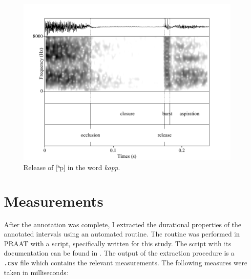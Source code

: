 \documentclass[11pt,a4paper,openany]{memoir}\usepackage[]{graphicx}\usepackage[]{color}
\begin{document}
\begin{figure}
\centering
\includegraphics[width=\textwidth]{kopp}
\caption{Release of [ʰp] in the word \textit{kopp}.}
\label{f:release}
\end{figure}

\section{Measurements}
\label{s:measurements}
After the annotation was complete, I extracted the durational properties of the annotated intervals using an automated routine.
The routine was performed in PRAAT with a script, specifically written for this study.
The script with its documentation can be found in .
The output of the extraction procedure is a \texttt{.csv} file which contains the relevant measurements.
The following measures were taken in milliseconds:
\end{document}
